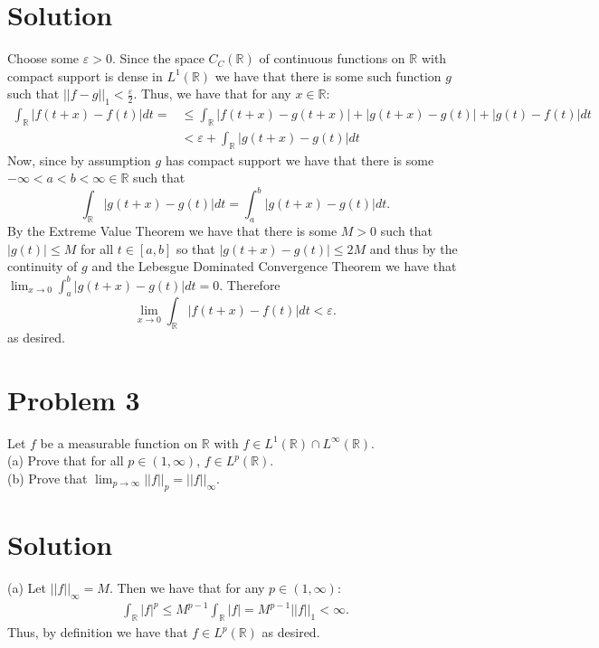 \documentclass{article}
\begin{document}
\section*{Solution}
Choose some $\varepsilon>0$.  Since the space $C_C(\mathbb{R})$ of continuous functions on $\mathbb{R}$ with compact support is dense in $L^1(\mathbb{R})$ we have that there is some such function $g$ such that $||f-g||_1<\frac{\varepsilon}{2}$.  Thus, we have that for any $x\in\mathbb{R}$:
\begin{align*}
\int_\mathbb{R}|f(t+x)-f(t)|dt=&\leq\int_\mathbb{R}|f(t+x)-g(t+x)|+|g(t+x)-g(t)|+|g(t)-f(t)|dt\\
&<\varepsilon+\int_\mathbb{R}|g(t+x)-g(t)|dt
\end{align*}
Now, since by assumption $g$ has compact support we have that there is some $-\infty<a<b<\infty\in\mathbb{R}$ such that $$\int_\mathbb{R}|g(t+x)-g(t)|dt=\int_a^b|g(t+x)-g(t)|dt.$$ By the Extreme Value Theorem we have that there is some $M>0$ such that $|g(t)|\leq M$ for all $t\in[a,b]$ so that $|g(t+x)-g(t)|\leq 2M$ and thus by the continuity of $g$ and the Lebesgue Dominated Convergence Theorem we have that $\lim_{x\rightarrow0}\int_a^b|g(t+x)-g(t)|dt=0$.  Therefore $$\lim_{x\rightarrow 0}\int_\mathbb{R}|f(t+x)-f(t)|dt<\varepsilon.$$ as desired.

\section*{Problem 3}
Let $f$ be a measurable function on $\mathbb{R}$ with $f\in L^1(\mathbb{R})\cap L^\infty(\mathbb{R})$.\\

\noindent (a) Prove that for all $p\in(1,\infty)$, $f\in L^p(\mathbb{R})$.\\

\noindent (b) Prove that $\lim_{p\rightarrow\infty}||f||_p=||f||_\infty$.

\section*{Solution}
(a) Let $||f||_\infty=M$.  Then we have that for any $p\in(1,\infty)$:
\begin{align*}
\int_\mathbb{R}|f|^p\leq M^{p-1}\int_\mathbb{R}|f|=M^{p-1}||f||_1<\infty.
\end{align*}
Thus, by definition we have that $f\in L^p(\mathbb{R})$ as desired.\\
\end{document}
